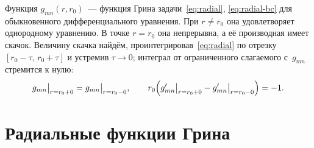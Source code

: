Функция $g_{mn}(r,r_0)$~— функция Грина задачи~\eqref{eq:radial},
\eqref{eq:radial-bc} для обыкновенного дифференциального уравнения. При
$r\ne r_0$ она удовлетворяет однородному уравнению. В точке $r=r_0$ она
непрерывна, а её производная имеет скачок. Величину скачка найдём,
проинтегрировав~\eqref{eq:radial} по отрезку $[r_0-\tau,\,r_0+\tau]$
и устремив $\tau\to0$; интеграл от ограниченного слагаемого
с~$g_{mn}$ стремится к нулю:
\begin{equation}
\label{eq:jump}
g_{mn}\big|_{r=r_0+0}=g_{mn}\big|_{r=r_0-0},\qquad
r_0\Bigl(g_{mn}'\big|_{r=r_0+0}-g_{mn}'\big|_{r=r_0-0}\Bigr)=-1 .
\end{equation}

\section{Радиальные функции Грина}
\label{sec:radial}

